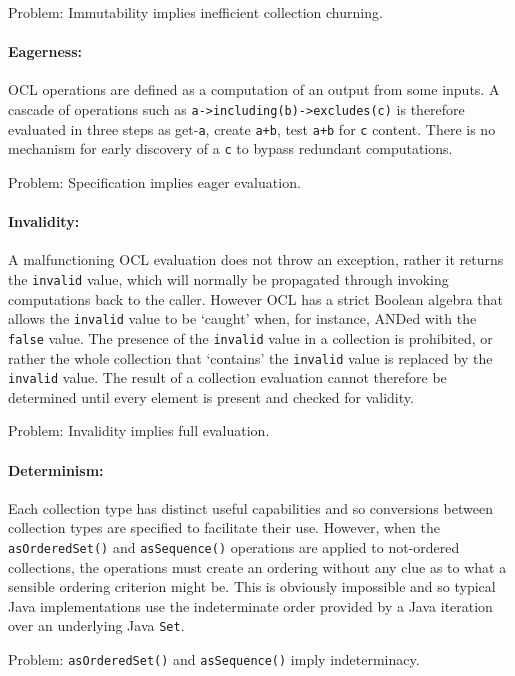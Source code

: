 \documentclass{llncs}
\begin{document}
Problem: Immutability implies inefficient collection churning.

\paragraph{Eagerness:}

OCL operations are defined as a computation of an output from some inputs. A cascade of operations such as \verb$a->including(b)->excludes(c)$ is therefore evaluated in three steps as get-\verb$a$, create \verb$a+b$, test \verb$a+b$ for \verb$c$ content. There is no mechanism for early discovery of a \verb$c$ to bypass redundant computations.

Problem: Specification implies eager evaluation.

\paragraph{Invalidity:}

A malfunctioning OCL evaluation does not throw an exception, rather it returns the \verb$invalid$ value, which will normally be propagated through invoking computations back to the caller. However OCL has a strict Boolean algebra that allows the \verb$invalid$ value to be `caught' when, for instance, ANDed with the \verb$false$ value. The presence of the \verb$invalid$ value in a collection is prohibited, or rather the whole collection that `contains' the \verb$invalid$ value is replaced by the \verb$invalid$ value. The result of a collection evaluation cannot therefore be determined until every element is present and checked for validity.

Problem: Invalidity implies full evaluation.

\paragraph{Determinism:}

Each collection type has distinct useful capabilities and so conversions between collection types are specified to facilitate their use. However, when the \verb$asOrderedSet()$ and \verb$asSequence()$ operations are applied to not-ordered collections, the operations must create an ordering without any clue as to what a sensible ordering criterion might be. This is obviously impossible and so typical Java implementations use the indeterminate order provided by a Java iteration over an underlying Java \verb$Set$.

Problem: \verb$asOrderedSet()$ and \verb$asSequence()$ imply indeterminacy.
\end{document}
